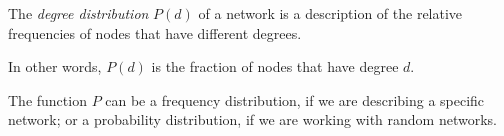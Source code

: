 \documentclass[
    preview, 
    varwidth = 12cm, 
    border = {2pt 0pt 0pt 0pt}
    ]{standalone} %
\begin{document}
\raggedright





The \emph{degree distribution} \(P(d)\) of a network is a description of the relative frequencies of nodes that
have different degrees. 
\vspace{1em}

In other words, \(P(d)\) is the fraction of nodes that have degree \(d\).
\vspace{1em}

The function \(P\) can be a frequency distribution, if we are describing a specific network;
or a probability distribution, if we are working with random networks.

\end{document}

